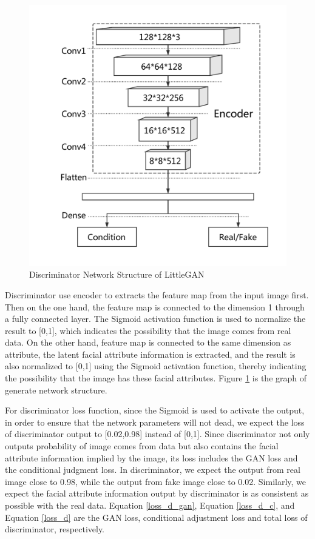 \begin{figure}
\begin{minipage}[t]{0.48\linewidth}
        \includegraphics[width=\textwidth]{figures/net_discriminator.pdf}
        \caption{Discriminator Network Structure of LittleGAN}
        \label{net_discriminator}
    \end{minipage}
\end{figure}

Discriminator use encoder to extracts the feature map from the input image first.
Then on the one hand, the feature map is connected to the dimension 1 through a fully connected layer.
The Sigmoid activation function is used to normalize the result to [0,1],
    which indicates the possibility that the image comes from real data.
On the other hand, feature map is connected to the same dimension as attribute,
    the latent facial attribute information is extracted,
    and the result is also normalized to [0,1] using the Sigmoid activation function,
    thereby indicating the possibility that the image has these facial attributes.
Figure \ref{net_discriminator} is the graph of generate network structure.


For discriminator loss function, since the Sigmoid is used to activate the output,
    in order to ensure that the network parameters will not dead,
    we expect the loss of discriminator output to [0.02,0.98] instead of [0,1].
Since discriminator not only outputs probability of image comes from data but also contains the facial attribute information implied by the image,
    its loss includes the GAN loss and the conditional judgment loss.
In discriminator, we expect the output from real image close to 0.98, while the output from fake image close to 0.02.
Similarly, we expect the facial attribute information output by discriminator is as consistent as possible with the real data.
Equation \eqref{loss_d_gan}, Equation \eqref{loss_d_c}, and Equation \eqref{loss_d} are the GAN loss,
    conditional adjustment loss and total loss of discriminator, respectively.

